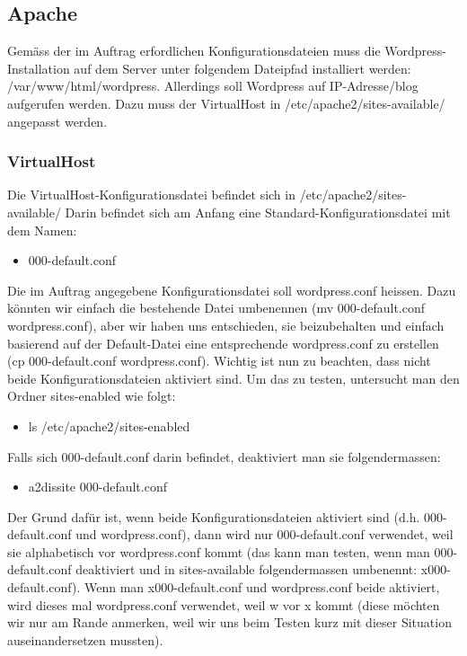 \documentclass{article}
\begin{document}
	\subsection{Apache}
	Gemäss der im Auftrag erfordlichen Konfigurationsdateien muss die Wordpress-Installation auf dem Server unter folgendem Dateipfad installiert werden: /var/www/html/wordpress.
	Allerdings soll Wordpress auf IP-Adresse/blog aufgerufen werden. Dazu muss der VirtualHost in /etc/apache2/sites-available/ angepasst werden.
	\subsubsection{VirtualHost}
	Die VirtualHost-Konfigurationsdatei befindet sich in /etc/apache2/sites-available/
	Darin befindet sich am Anfang eine Standard-Konfigurationsdatei mit dem Namen:
	\begin{itemize}
		\item 000-default.conf
	\end{itemize}		
	Die im Auftrag angegebene Konfigurationsdatei soll wordpress.conf heissen. Dazu könnten wir einfach die bestehende Datei umbenennen (mv 000-default.conf wordpress.conf), aber wir haben uns entschieden, sie beizubehalten und einfach basierend auf der Default-Datei eine entsprechende wordpress.conf zu erstellen (cp 000-default.conf wordpress.conf). Wichtig ist nun zu beachten, dass nicht beide Konfigurationsdateien aktiviert sind. Um das zu testen, untersucht man den Ordner sites-enabled wie folgt:
	\begin{itemize}
		\item ls /etc/apache2/sites-enabled
	\end{itemize}
	Falls sich  000-default.conf darin befindet, deaktiviert man sie folgendermassen:
	\begin{itemize}
		\item a2dissite  000-default.conf
	\end{itemize}
	Der Grund dafür ist, wenn beide Konfigurationsdateien aktiviert sind (d.h. 000-default.conf und wordpress.conf), dann wird nur 000-default.conf verwendet, weil sie alphabetisch vor wordpress.conf kommt (das kann man testen, wenn man 000-default.conf deaktiviert und in sites-available folgendermassen umbenennt: x000-default.conf). Wenn man x000-default.conf und wordpress.conf beide aktiviert, wird dieses mal wordpress.conf verwendet, weil w vor x kommt (diese möchten wir nur am Rande anmerken, weil wir uns beim Testen kurz mit dieser Situation auseinandersetzen mussten).
\end{document}
